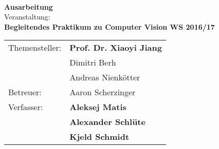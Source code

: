 \thispagestyle{empty}
\vspace*{2cm}
\begin{center}
\Large
\textbf{\inserttitle}\\
\normalsize
\vspace*{1cm}
\textbf{Ausarbeitung}\\
\vspace*{1cm}
Veranstaltung:\\
\textbf{Begleitendes Praktikum zu Computer Vision WS 2016/17}
\end{center}
\vfill

\begin{center}
\begin{tabular}{ll}
Themensteller:&\textbf{Prof. Dr. Xiaoyi Jiang}\\
&Dimitri Berh\\
&Andreas Nienkötter\\
Betreuer:&Aaron Scherzinger\\
Verfasser:&\textbf{Aleksej Matis}\\
&\textbf{Alexander Schlüte}\\
&\textbf{Kjeld Schmidt}
\end{tabular} 
\end{center}